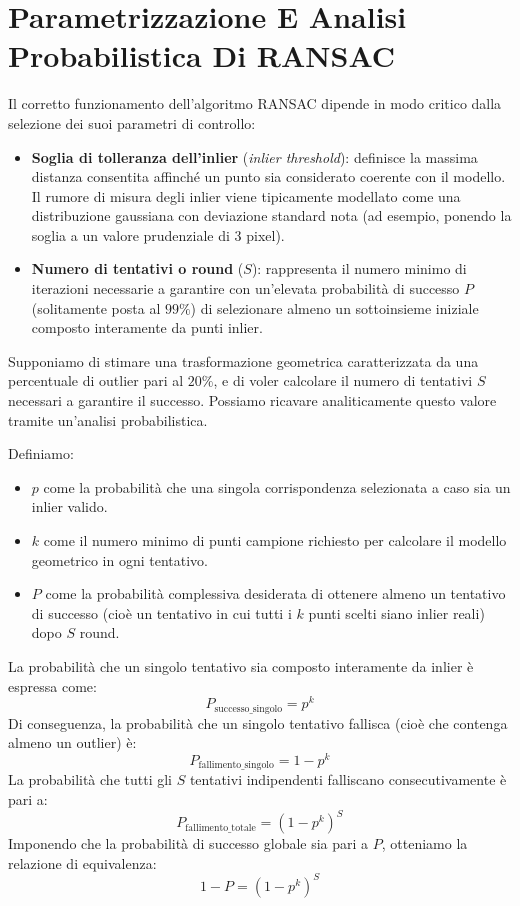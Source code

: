 ﻿\documentclass[11pt, a4paper]{article}
\begin{document}
\newpage

\section{Parametrizzazione E Analisi Probabilistica Di RANSAC}

Il corretto funzionamento dell'algoritmo RANSAC dipende in modo critico dalla selezione dei suoi parametri di controllo:
\begin{itemize}[noitemsep]
    \item \textbf{Soglia di tolleranza dell'inlier} (\emph{inlier threshold}): definisce la massima distanza consentita affinché un punto sia considerato coerente con il modello. Il rumore di misura degli inlier viene tipicamente modellato come una distribuzione gaussiana con deviazione standard nota (ad esempio, ponendo la soglia a un valore prudenziale di $3$ pixel).
    \item \textbf{Numero di tentativi o round} ($S$): rappresenta il numero minimo di iterazioni necessarie a garantire con un'elevata probabilità di successo $P$ (solitamente posta al $99\%$) di selezionare almeno un sottoinsieme iniziale composto interamente da punti inlier.
\end{itemize}

Supponiamo di stimare una trasformazione geometrica caratterizzata da una percentuale di outlier pari al $20\%$, e di voler calcolare il numero di tentativi $S$ necessari a garantire il successo. Possiamo ricavare analiticamente questo valore tramite un'analisi probabilistica.

Definiamo:
\begin{itemize}[noitemsep]
    \item $p$ come la probabilità che una singola corrispondenza selezionata a caso sia un inlier valido.
    \item $k$ come il numero minimo di punti campione richiesto per calcolare il modello geometrico in ogni tentativo.
    \item $P$ come la probabilità complessiva desiderata di ottenere almeno un tentativo di successo (cioè un tentativo in cui tutti i $k$ punti scelti siano inlier reali) dopo $S$ round.
\end{itemize}

La probabilità che un singolo tentativo sia composto interamente da inlier è espressa come:
\[
P_{\text{successo\_singolo}} = p^k
\]
Di conseguenza, la probabilità che un singolo tentativo fallisca (cioè che contenga almeno un outlier) è:
\[
P_{\text{fallimento\_singolo}} = 1 - p^k
\]
La probabilità che tutti gli $S$ tentativi indipendenti falliscano consecutivamente è pari a:
\[
P_{\text{fallimento\_totale}} = \left(1 - p^k\right)^S
\]
Imponendo che la probabilità di successo globale sia pari a $P$, otteniamo la relazione di equivalenza:
\[
1 - P = \left(1 - p^k\right)^S
\]
\end{document}
